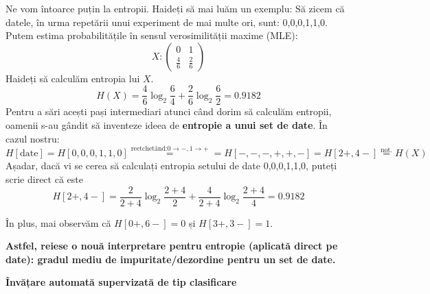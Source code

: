 \documentclass[12pt]{article}
\begin{document}
	Ne vom întoarce puțin la entropii. Haideți să mai luăm un exemplu:
	Să zicem că datele, în urma repetării unui experiment de mai multe ori, sunt: 0,0,0,1,1,0. Putem estima probabilitățile în sensul verosimilității maxime (MLE):
	$$X:\begin{pmatrix}
	0 & 1\\
	\frac{4}{6} & \frac{2}{6}
	\end{pmatrix}$$
	Haideți să calculăm entropia lui $X$.
	$$H(X) = \frac{4}{6} \log_2 \frac{6}{4} + \frac{2}{6} \log_2 \frac{6}{2} = 0.9182$$
	Pentru a sări acești pași intermediari atunci când dorim să calculăm entropii, oamenii s-au gândit să inventeze ideea de \textbf{entropie a unui set de date}. În cazul nostru: 
	$$H[\text{date}] = H[0,0,0,1,1,0] \stackrel{\text{reetchetând:}0\rightarrow -, 1\rightarrow +}{=} = H[-,-,-,+,+,-] = H[2+,4-] \stackrel{\text{not.}}{=} H(X)$$
	Așadar, dacă vi se cerea să calculați entropia setului de date 0,0,0,1,1,0, puteți scrie direct că este
	$$H[2+,4-] = \frac{2}{2+4} \log_2 \frac{2+4}{2} + \frac{4}{2+4} \log_2 \frac{2+4}{4} = 0.9182$$
	
	În plus, mai observăm că $H[0+,6-]=0$ și $H[3+,3-]=1$.
	
	\textbf{Astfel, reiese o nouă interpretare pentru entropie (aplicată direct pe date):
		gradul mediu de impuritate/dezordine pentru un set de date.}
	
	\newpage
	
	\textbf{\large{Învățare automată supervizată de tip clasificare}}
	
\end{document}
